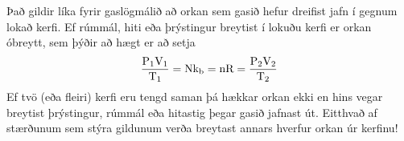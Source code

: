 Það gildir líka fyrir gaslögmálið að orkan sem gasið hefur dreifist jafn í gegnum
lokað kerfi. Ef rúmmál, hiti eða þrýstingur breytist í lokuðu kerfi er orkan
óbreytt, sem þýðir að hægt er að setja
\begin{align}
	\frac{\text{P}_1 \text{V}_1}{\text{T}_1}
		= \text{N} \text{k}_\text{b}
		= \text{n} \text{R}
		= \frac{\text{P}_2 \text{V}_2}{\text{T}_2}
\end{align}
Ef tvö (eða fleiri) kerfi eru tengd saman þá hækkar orkan ekki en hins vegar 
breytist þrýstingur, rúmmál eða hitastig þegar gasið jafnast út. Eitthvað
af stærðunum sem stýra gildunum verða breytast annars hverfur orkan úr
kerfinu!
